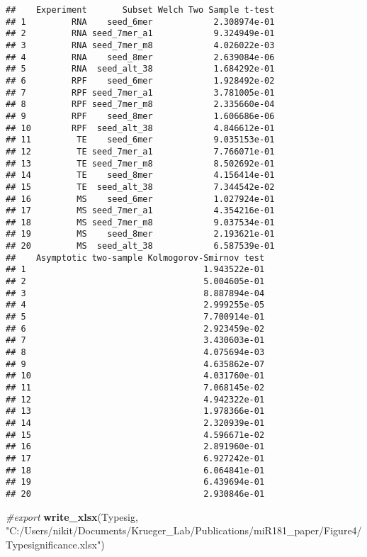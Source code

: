 \documentclass[
]{article}
\newenvironment{Shaded}{\begin{snugshade}}{\end{snugshade}}
\newcommand{\CommentTok}[1]{\textcolor[rgb]{0.56,0.35,0.01}{\textit{#1}}}
\newcommand{\FunctionTok}[1]{\textcolor[rgb]{0.13,0.29,0.53}{\textbf{#1}}}
\newcommand{\NormalTok}[1]{#1}
\newcommand{\StringTok}[1]{\textcolor[rgb]{0.31,0.60,0.02}{#1}}
\begin{document}
\begin{verbatim}
##    Experiment       Subset Welch Two Sample t-test
## 1         RNA    seed_6mer            2.308974e-01
## 2         RNA seed_7mer_a1            9.324949e-01
## 3         RNA seed_7mer_m8            4.026022e-03
## 4         RNA    seed_8mer            2.639084e-06
## 5         RNA  seed_alt_38            1.684292e-01
## 6         RPF    seed_6mer            1.928492e-02
## 7         RPF seed_7mer_a1            3.781005e-01
## 8         RPF seed_7mer_m8            2.335660e-04
## 9         RPF    seed_8mer            1.606686e-06
## 10        RPF  seed_alt_38            4.846612e-01
## 11         TE    seed_6mer            9.035153e-01
## 12         TE seed_7mer_a1            7.766071e-01
## 13         TE seed_7mer_m8            8.502692e-01
## 14         TE    seed_8mer            4.156414e-01
## 15         TE  seed_alt_38            7.344542e-02
## 16         MS    seed_6mer            1.027924e-01
## 17         MS seed_7mer_a1            4.354216e-01
## 18         MS seed_7mer_m8            9.037534e-01
## 19         MS    seed_8mer            2.193621e-01
## 20         MS  seed_alt_38            6.587539e-01
##    Asymptotic two-sample Kolmogorov-Smirnov test
## 1                                   1.943522e-01
## 2                                   5.004605e-01
## 3                                   8.887894e-04
## 4                                   2.999255e-05
## 5                                   7.700914e-01
## 6                                   2.923459e-02
## 7                                   3.430603e-01
## 8                                   4.075694e-03
## 9                                   4.635862e-07
## 10                                  4.031760e-01
## 11                                  7.068145e-02
## 12                                  4.942322e-01
## 13                                  1.978366e-01
## 14                                  2.320939e-01
## 15                                  4.596671e-02
## 16                                  2.891960e-01
## 17                                  6.927242e-01
## 18                                  6.064841e-01
## 19                                  6.439694e-01
## 20                                  2.930846e-01
\end{verbatim}

\begin{Shaded}
\begin{Highlighting}[]
\CommentTok{\#export}
\FunctionTok{write\_xlsx}\NormalTok{(Typesig, }\StringTok{"C:/Users/nikit/Documents/Krueger\_Lab/Publications/miR181\_paper/Figure4/Typesignificance.xlsx"}\NormalTok{)}
\end{Highlighting}
\end{Shaded}
\end{document}
